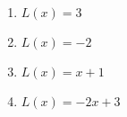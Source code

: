 \begin{enumerate}
\begin{enumerate}
 \begin{multicols}{4}
 
  \begin{enumerate} 
  
  \item $L(x) = 3$
  
  \item $L(x) = -2$
  
  \item $L(x) = x+1$
  
  \item $L(x) = -2x+3$
  
  \end{enumerate} 
  
  \end{multicols} 
  
  \end{enumerate}
\setcounter{HW}{\value{enumi}}
\end{enumerate}
